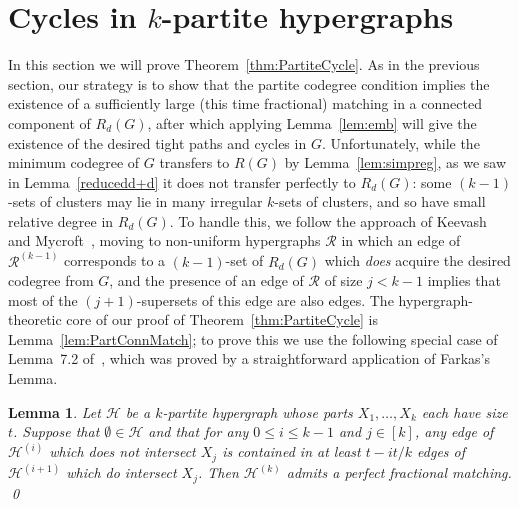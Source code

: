 \documentclass[12pt,a4paper]{amsart}
\newtheorem{lemma}[theorem] {Lemma}
\newcommand{\Hy}{\mathcal{H}}
\newcommand{\cR}{\mathcal{R}}
\begin{document}
\section{Cycles in $k$-partite hypergraphs}\label{sec:partite}
In this section we will prove Theorem~\ref{thm:PartiteCycle}. As in the
previous section, our strategy is to show that the partite codegree condition
implies the existence of a sufficiently large (this time fractional) matching in
a connected component of $R_d(G)$, after which applying Lemma~\ref{lem:emb} will
give the existence of the desired tight paths and cycles in $G$.
Unfortunately, while the minimum codegree of $G$ transfers to $R(G)$ by
Lemma~\ref{lem:simpreg}, as we saw in Lemma~\ref{reducedd+d} it does not
transfer perfectly to $R_d(G)$: some $(k-1)$-sets of clusters may lie in many
irregular $k$-sets of clusters, and so have small relative degree in $R_d(G)$.
To handle this, we follow the approach of Keevash and Mycroft~\cite{KeeMyc},
moving to non-uniform hypergraphs $\cR$ in which an edge of $\cR^{(k-1)}$
corresponds to a $(k-1)$-set of $R_d(G)$ which \emph{does} acquire the
desired codegree from $G$, and the presence of an edge of $\cR$ of size $j <
k-1$ implies that most of the $(j+1)$-supersets of this edge are also edges.
The hypergraph-theoretic core of our proof of Theorem~\ref{thm:PartiteCycle} is
Lemma~\ref{lem:PartConnMatch}; to prove this we use the following special case
of Lemma~7.2 of~\cite{KeeMyc}, which was proved by a straightforward
application of Farkas's Lemma.

\begin{lemma}\label{lem:FracMatch}
Let $\Hy$ be a $k$-partite hypergraph whose parts $X_1, \dots, X_k$ each have size $t$. Suppose that $\emptyset \in \Hy$ and that for any $0 \leq i \leq k-1$ and $j \in [k]$, any edge of $\Hy^{(i)}$ which does not intersect $X_j$ is contained in at least $t - it/k$ edges of $\Hy^{(i+1)}$ which do intersect $X_j$. Then $\Hy^{(k)}$ admits a perfect fractional matching. \qed
\end{lemma}
\end{document}
